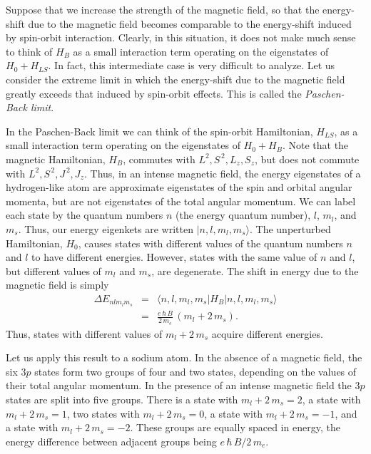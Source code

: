 Suppose that we increase the strength of the magnetic
field, so that the energy-shift due to the magnetic field becomes
comparable to the energy-shift induced by spin-orbit interaction. 
Clearly, in this situation, it does not make much sense to think
of $H_B$ as a small interaction term operating on the eigenstates
of $H_0 + H_{LS}$. In fact, this intermediate case is very difficult
to analyze. Let us consider the extreme limit in which the energy-shift
due to the magnetic field greatly exceeds that induced by spin-orbit effects.
This  is called the {\em Paschen-Back limit}. 

In the Paschen-Back
limit we can think of the spin-orbit Hamiltonian, $H_{LS}$, as
a small interaction term operating on the eigenstates of
$H_0 + H_B$. Note that the magnetic Hamiltonian, $H_B$, commutes
with $L^2, S^{\,2}, L_z, S_z$, but does not commute with $L^2, S^{\,2}, J^{\,2},
J_z$. Thus, in an intense magnetic field, the energy eigenstates of
a hydrogen-like atom are approximate eigenstates of the 
spin and orbital angular momenta,  but are not eigenstates of the
total angular momentum. We can label each state by the quantum
numbers $n$ (the energy quantum number), $l$, $m_l$, and $m_s$. 
Thus, our energy eigenkets are written $|n, l,m_l, m_s\rangle$. 
The unperturbed Hamiltonian, $H_0$, causes states with different
values of the quantum numbers $n$ and $l$ to have different energies. 
However, states with the same value of $n$ and $l$, but different
values of $m_l$ and $m_s$, are degenerate.
The shift in energy due to the magnetic field is simply
\begin{eqnarray}
\Delta E_{nlm_l m_s}&=& \langle n,l,m_l, m_s| H_B| n,l,m_l, m_s\rangle\nonumber\\[0.5ex]
&=& \frac{e\, \hbar \,B} {2 \,m_e} \,(m_l + 2 \,m_s).
\end{eqnarray}
Thus, states with different values of $m_l + 2\, m_s$ acquire different
energies. 

Let us apply this result to a sodium atom. In the absence of
a magnetic field, the six $3p$ states form two groups of four and
two states, depending on the values of their total angular momentum.
In the presence of an intense magnetic field the $3p$  states are split
into five groups. There is  a state with $m_l+2\,m_s = 2$,
a state with $m_l+2\,m_s = 1$, two states with $m_l+2\,m_s = 0$,
a state with $m_l+2\,m_s = -1$, and a state with
$m_l+2\,m_s = -2$.  These groups are equally spaced in energy,
the energy difference between adjacent groups being 
$e \,\hbar\, B/ 2\,m_e$. 

